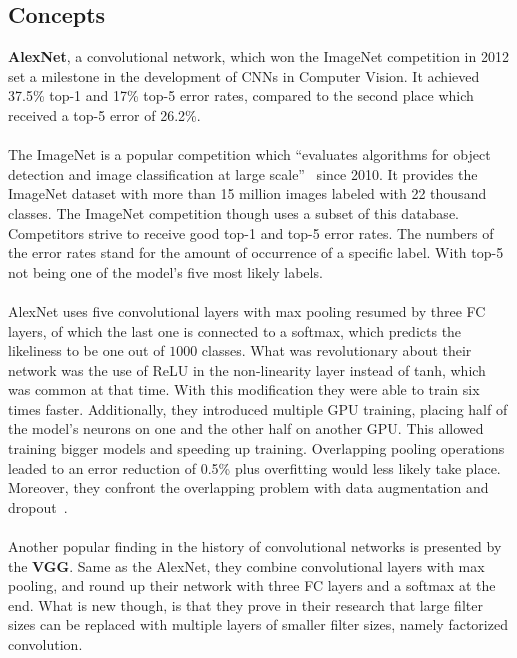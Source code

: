 \subsection{Concepts}


\textbf{AlexNet}, a convolutional network, which won the \gls{ImageNet} competition in 2012 set a milestone in the development
of \glspl{CNN} in Computer Vision.
It achieved 37.5\% top-1 and 17\% top-5 error rates, compared to the second place which received a top-5 error
of 26.2\%.
\\\mbox{}\\
The \gls{ImageNet} is a popular competition which
\enquote{evaluates algorithms for object detection and image classification at large scale}~\cite{ILSVRC15}
since 2010.
It provides the ImageNet dataset with more than 15 million images labeled with 22 thousand classes.
The \gls{ImageNet} competition though uses a subset of this database.
Competitors strive to receive good top-1 and top-5 error rates.
The numbers of the error rates stand for the amount of occurrence of a specific label.
With top-5 not being one of the model's five most likely labels.
\\\mbox{}\\
AlexNet uses five convolutional layers with max pooling resumed by three \gls{FC} layers, of which the last one
is connected to a softmax, which predicts the likeliness to be one out of $1000$ classes.
What was revolutionary about their network was the use of \gls{ReLU} in the non-linearity layer instead of tanh,
which was common at that time.
With this modification they were able to train six times faster.
Additionally, they introduced multiple GPU training, placing half of the model's neurons on one and the other half
on another GPU.
This allowed training bigger models and speeding up training.
Overlapping pooling operations leaded to an error reduction of 0.5\% plus overfitting would less likely take place.
Moreover, they confront the overlapping problem with data augmentation and dropout~\cite{advanceddeeplearningpython,
alexnet}.
\\\mbox{}\\
Another popular finding in the history of convolutional networks is presented by the \textbf{\gls{VGG}}.
Same as the AlexNet, they combine convolutional layers with max pooling, and round up their network with
three \gls{FC} layers and a softmax at the end.
What is new though, is that they prove in their research that large filter sizes can be replaced with multiple layers
of smaller filter sizes, namely
factorized convolution.
